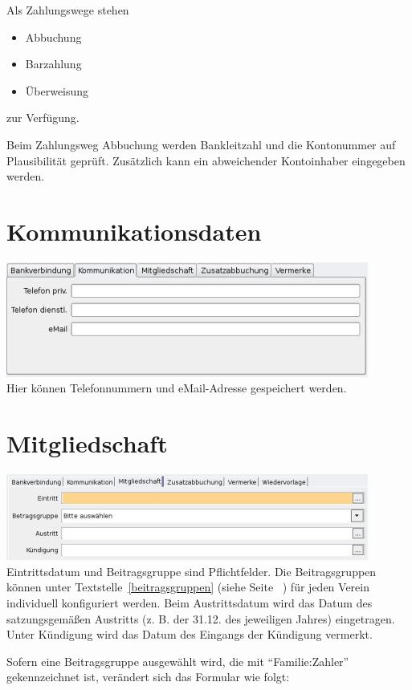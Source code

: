 \documentclass[a4paper,BCOR30mm,DIV14,pdftex,liststotoc,footsepline,openany]{scrbook}
\begin{document}
Als Zahlungswege stehen
\begin{itemize}
 \item Abbuchung
 \item Barzahlung
 \item Überweisung
\end{itemize}
zur Verfügung.


Beim Zahlungsweg Abbuchung werden Bankleitzahl und die Kontonummer auf Plausibilität geprüft. Zusätzlich kann ein
abweichender Kontoinhaber eingegeben werden.

\section{Kommunikationsdaten}
\includegraphics{./screenshots/mitgliedkommunikation.jpg}\\
Hier können Telefonnummern und eMail-Adresse gespeichert werden.

\section{Mitgliedschaft}
\includegraphics{./screenshots/mitgliedmitgliedschaft.jpg}\\

Eintrittsdatum und Beitragsgruppe sind Pflichtfelder. Die Beitragsgruppen können unter Textstelle~\ref{beitragsgruppen} (siehe Seite ~\pageref{beitragsgruppen}) für jeden Verein individuell
konfiguriert werden. Beim Austrittsdatum wird das Datum des satzungsgemäßen Austritts (z. B. der 31.12. des jeweiligen
Jahres) eingetragen. Unter Kündigung wird das Datum des Eingangs der Kündigung vermerkt.

Sofern eine Beitragsgruppe ausgewählt wird, die mit ``Familie:Zahler'' gekennzeichnet ist, verändert sich das Formular
wie folgt:
\end{document}
